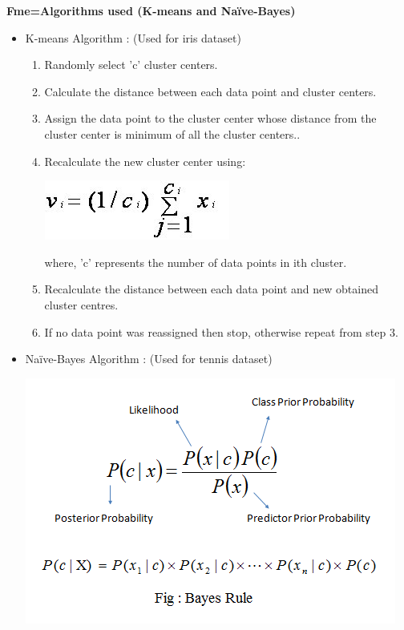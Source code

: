 \documentclass[10pt,a4paper]{article}
\begin{document}
	{\rmfamily
		\textbf{Fme=Algorithms used (K-means and Naïve-Bayes)}
		
		
			\begin{itemize}
				\item K-means Algorithm : (Used for iris dataset)
				
				\begin{enumerate}
					\item Randomly select 'c' cluster centers.
					\item Calculate the distance between each data point and cluster centers.
					\item  Assign the data point to the cluster center whose distance from the cluster center is minimum of all the cluster centers..
					\item  Recalculate the new cluster center using:  
					\begin{center}
						\includegraphics[scale=0.5]{equation.jpg}
					\end{center}
					where, 'c' represents the number of data points in ith cluster.
					\item Recalculate the distance between each data point and new obtained cluster centres.
					\item If no data point was reassigned then stop, otherwise repeat from step 3.
					
				\end{enumerate}
				
				\item Naïve-Bayes Algorithm : (Used for tennis dataset)
				
				\includegraphics[scale=0.5]{nb.png}
			\end{itemize}
			
}
\end{document}
